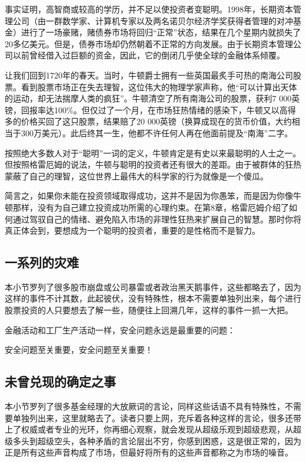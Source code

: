 \documentclass[12pt,oneside]{book}
\begin{document}
事实证明，高智商或较高的学历，并不足以使投资者变聪明。1998年，长期资本管理公司（由一群数学家、计算机专家以及两名诺贝尔经济学奖获得者管理的对冲基金）进行了一场豪赌，赌债券市场将回归“正常”状态，结果在几个星期内就损失了20多亿美元。但是，债券市场却仍然朝着不正常的方向发展。由于长期资本管理公司以前曾经借入过巨额的资金，因此，它的倒闭几乎使全球的金融体系倾覆。

让我们回到1720年的春天。当时，牛顿爵士拥有一些英国最炙手可热的南海公司股票。看到股票市场正在失去理智，这位伟大的物理学家声称，他“可以计算出天体的运动，却无法揣摩人类的疯狂”。牛顿清空了所有南海公司的股票，获利7 000英镑，回报率达100\%。但仅过了一个月，在市场狂热情绪的感染下，牛顿又以高得多的价格买回了这只股票，结果赔了20 000英镑（换算成现在的货币价值，大约相当于300万美元）。此后终其一生，他都不许任何人再在他面前提及“南海”二字。

按照绝大多数人对于“聪明”一词的定义，牛顿肯定是有史以来最聪明的人士之一。但按照格雷厄姆的说法，牛顿与聪明的投资者还有很大的差距。由于被群体的狂热蒙蔽了自己的理智，这位世界上最伟大的科学家的行为就像是一个傻瓜。

简言之，如果你未能在投资领域取得成功，这并不是因为你愚笨，而是因为你像牛顿那样，没有为自己建立投资成功所需的心理约束。在第8章，格雷厄姆介绍了如何通过驾驭自己的情绪、避免陷入市场的非理性狂热来扩展自己的智慧。那时你将真正体会到，要想成为一个聪明的投资者，重要的是性格而不是智力。

\subsection{一系列的灾难}
本小节罗列了很多股市崩盘或公司暴雷或者政治黑天鹅事件，这些都略去了，因为这样的事件不计其数，此起彼伏，没有特殊性，根本不需要单独列出来，每个进行股票投资的人只要想去了解一些，随便往上回溯几年，这样的事件一抓一大把。

金融活动和工厂生产活动一样，安全问题永远是最重要的问题：

安全问题至关重要，安全问题至关重要！


\subsection{未曾兑现的确定之事}
本小节罗列了很多基金经理的大放厥词的言论，同样这些话语不具有特殊性，不需要单独列出来，这里就略去了。读者只要上网，充斥着各种这样的言论，很多还带上了权威或者专业的光环，你再细心观察，就会发现从超级乐观到超级悲观，从超级多头到超级空头，各种矛盾的言论层出不穷，你感到困惑，这是很正常的，因为正是所有这些声音构成了市场，但最好将所有的这些声音都称之为市场的噪音。
\end{document}
